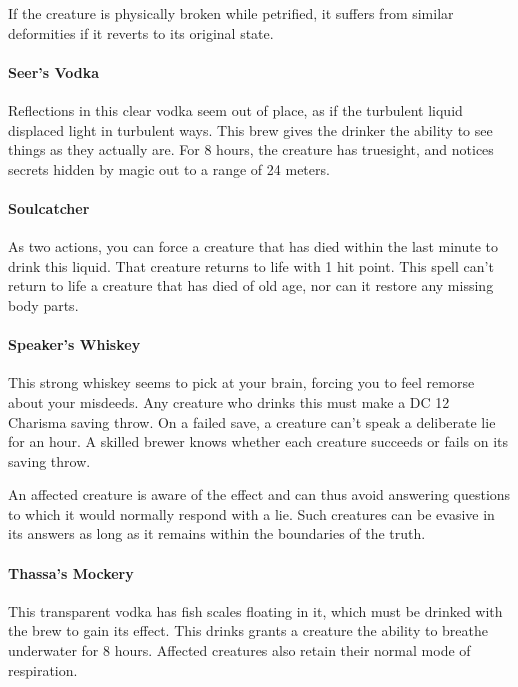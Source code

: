         If the creature is physically broken while petrified, it suffers from similar deformities if it reverts to its original state.
    \paragraph{Seer's Vodka} %
        Reflections in this clear vodka seem out of place, as if the turbulent liquid displaced light in turbulent ways.
        This brew gives the drinker the ability to see things as they actually are.
        For 8 hours, the creature has truesight, and notices secrets hidden by magic out to a range of 24 meters.
    \paragraph{Soulcatcher} %
        As two actions, you can force a creature that has died within the last minute to drink this liquid.
        That creature returns to life with 1 hit point.
        This spell can't return to life a creature that has died of old age, nor can it restore any missing body parts.
    \paragraph{Speaker's Whiskey} %
        This strong whiskey seems to pick at your brain, forcing you to feel remorse about your misdeeds.
        Any creature who drinks this must make a DC 12 Charisma saving throw.
        On a failed save, a creature can't speak a deliberate lie for an hour.
        A skilled brewer knows whether each creature succeeds or fails on its saving throw.

        An affected creature is aware of the effect and can thus avoid answering questions to which it would normally respond with a lie.
        Such creatures can be evasive in its answers as long as it remains within the boundaries of the truth.
    \paragraph{Thassa's Mockery} %
        This transparent vodka has fish scales floating in it, which must be drinked with the brew to gain its effect.
        This drinks grants a creature the ability to breathe underwater for 8 hours.
        Affected creatures also retain their normal mode of respiration.
\newpage
